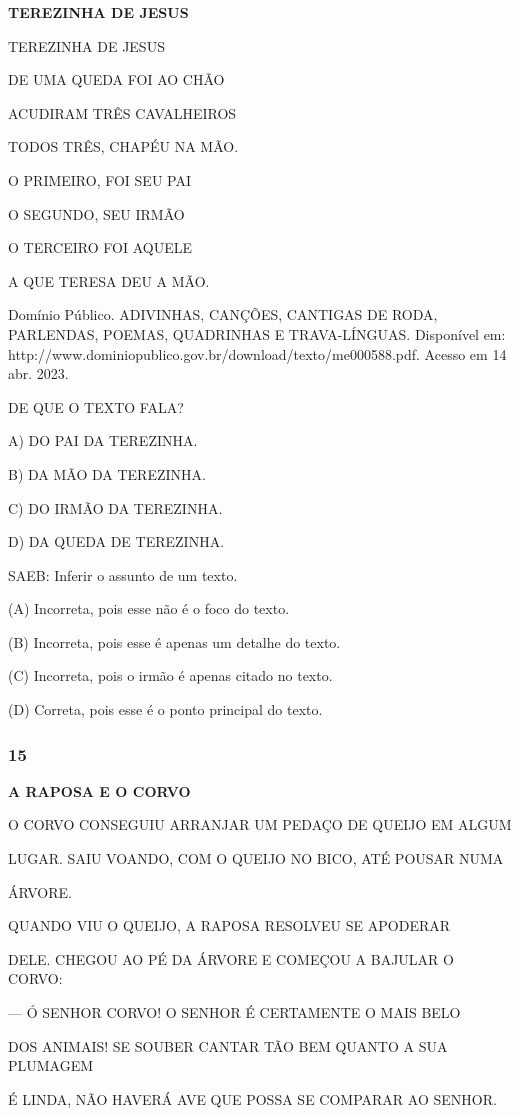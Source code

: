 \textbf{TEREZINHA DE JESUS}

TEREZINHA DE JESUS

DE UMA QUEDA FOI AO CHÃO

ACUDIRAM TRÊS CAVALHEIROS

TODOS TRÊS, CHAPÉU NA MÃO.

O PRIMEIRO, FOI SEU PAI

O SEGUNDO, SEU IRMÃO

O TERCEIRO FOI AQUELE

A QUE TERESA DEU A MÃO.

Domínio Público. ADIVINHAS, CANÇÕES, CANTIGAS DE RODA, PARLENDAS, POEMAS, QUADRINHAS E TRAVA-LÍNGUAS. Disponível em: http://www.dominiopublico.gov.br/download/texto/me000588.pdf. Acesso em 14 abr. 2023.

DE QUE O TEXTO FALA?

A) DO PAI DA TEREZINHA.

B) DA MÃO DA TEREZINHA.

C) DO IRMÃO DA TEREZINHA.

D) DA QUEDA DE TEREZINHA.

SAEB: Inferir o assunto de um texto.

(A) Incorreta, pois esse não é o foco do texto.

(B) Incorreta, pois esse é apenas um detalhe do texto.

(C) Incorreta, pois o irmão é apenas citado no texto.

(D) Correta, pois esse é o ponto principal do texto.

\subsubsection{15 }\label{section-71}

\textbf{A RAPOSA E O CORVO}

O CORVO CONSEGUIU ARRANJAR UM PEDAÇO DE QUEIJO EM ALGUM

LUGAR. SAIU VOANDO, COM O QUEIJO NO BICO, ATÉ POUSAR NUMA

ÁRVORE.

QUANDO VIU O QUEIJO, A RAPOSA RESOLVEU SE APODERAR

DELE. CHEGOU AO PÉ DA ÁRVORE E COMEÇOU A BAJULAR O CORVO:

--- Ó SENHOR CORVO! O SENHOR É CERTAMENTE O MAIS BELO

DOS ANIMAIS! SE SOUBER CANTAR TÃO BEM QUANTO A SUA PLUMAGEM

É LINDA, NÃO HAVERÁ AVE QUE POSSA SE COMPARAR AO SENHOR.

